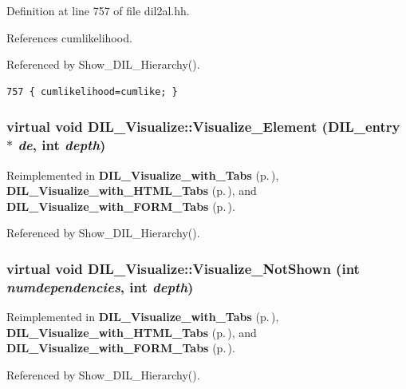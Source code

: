 Definition at line 757 of file dil2al.hh.

References cumlikelihood.

Referenced by Show\_\-DIL\_\-Hierarchy().



\footnotesize\begin{verbatim}757 { cumlikelihood=cumlike; }
\end{verbatim}\normalsize 
{}
\subsubsection{\setlength{\rightskip}{0pt plus 5cm}virtual void DIL\_\-Visualize::Visualize\_\-Element ({\bf DIL\_\-entry} $\ast$ {\em de}, int {\em depth})\hspace{0.3cm}{\tt  [virtual]}}\label{classDIL__Visualize_a5}




Reimplemented in {\bf DIL\_\-Visualize\_\-with\_\-Tabs} {\rm (p.\,\pageref{classDIL__Visualize__with__Tabs_a2})}, {\bf DIL\_\-Visualize\_\-with\_\-HTML\_\-Tabs} {\rm (p.\,\pageref{classDIL__Visualize__with__HTML__Tabs_a2})}, and {\bf DIL\_\-Visualize\_\-with\_\-FORM\_\-Tabs} {\rm (p.\,\pageref{classDIL__Visualize__with__FORM__Tabs_a2})}.

Referenced by Show\_\-DIL\_\-Hierarchy().
\subsubsection{\setlength{\rightskip}{0pt plus 5cm}virtual void DIL\_\-Visualize::Visualize\_\-Not\-Shown (int {\em numdependencies}, int {\em depth})\hspace{0.3cm}{\tt  [virtual]}}\label{classDIL__Visualize_a6}




Reimplemented in {\bf DIL\_\-Visualize\_\-with\_\-Tabs} {\rm (p.\,\pageref{classDIL__Visualize__with__Tabs_a3})}, {\bf DIL\_\-Visualize\_\-with\_\-HTML\_\-Tabs} {\rm (p.\,\pageref{classDIL__Visualize__with__HTML__Tabs_a3})}, and {\bf DIL\_\-Visualize\_\-with\_\-FORM\_\-Tabs} {\rm (p.\,\pageref{classDIL__Visualize__with__FORM__Tabs_a3})}.

Referenced by Show\_\-DIL\_\-Hierarchy().

